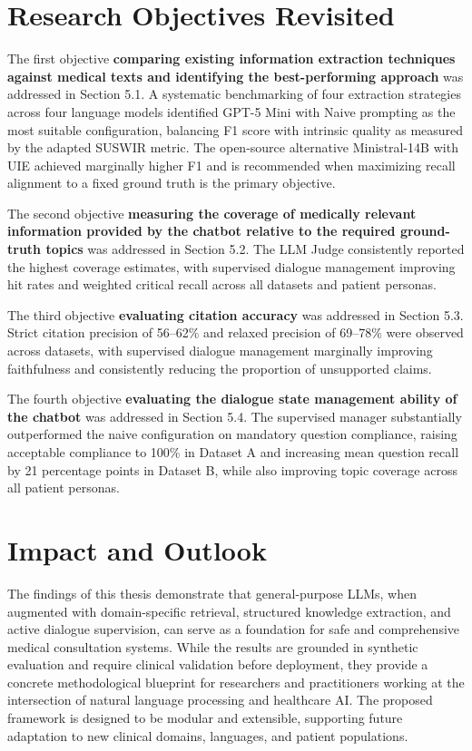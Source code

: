 \section{Research Objectives Revisited}

The first objective \textbf{comparing existing information extraction techniques against medical texts and identifying the best-performing approach} was addressed in Section 5.1. 
A systematic benchmarking of four extraction strategies across four language models identified GPT-5 Mini with Naive prompting as the most suitable configuration, balancing F1 score with intrinsic quality as measured by the adapted SUSWIR metric. 
The open-source alternative Ministral-14B with UIE achieved marginally higher F1 and is recommended when maximizing recall alignment to a fixed ground truth is the primary objective.

The second objective \textbf{measuring the coverage of medically relevant information provided by the chatbot relative to the required ground-truth topics} was addressed in Section 5.2. 
The LLM Judge consistently reported the highest coverage estimates, with supervised dialogue management improving hit rates and weighted critical recall across all datasets and patient personas.

The third objective \textbf{evaluating citation accuracy} was addressed in Section 5.3.
Strict citation precision of 56--62\% and relaxed precision of 69--78\% were observed across datasets, with supervised dialogue management marginally improving faithfulness and consistently reducing the proportion of unsupported claims.

The fourth objective \textbf{evaluating the dialogue state management ability of the chatbot} was addressed in Section 5.4. 
The supervised manager substantially outperformed the naive configuration on mandatory question compliance, raising acceptable compliance to 100\% in Dataset A and increasing mean question recall by 21 percentage points in Dataset B, while also improving topic coverage across all patient personas.

\section{Impact and Outlook}

The findings of this thesis demonstrate that general-purpose LLMs, when augmented with domain-specific retrieval, structured knowledge extraction, and active dialogue supervision, can serve as a foundation for safe and comprehensive medical consultation systems. 
While the results are grounded in synthetic evaluation and require clinical validation before deployment, they provide a concrete methodological blueprint for researchers and practitioners working at the intersection of natural language processing and healthcare AI.
The proposed framework is designed to be modular and extensible, supporting future adaptation to new clinical domains, languages, and patient populations.